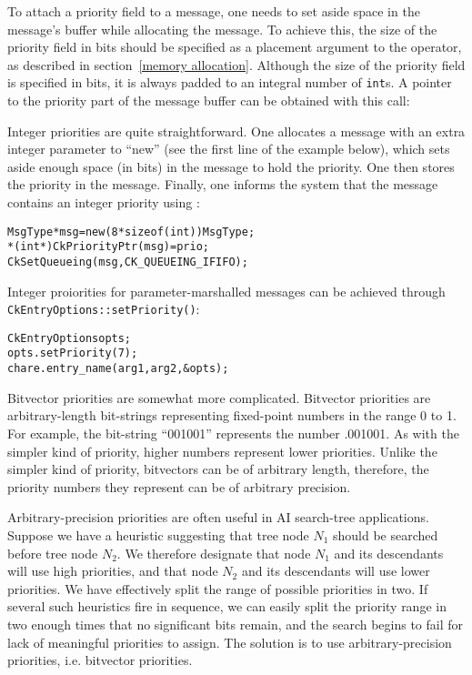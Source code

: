To attach a priority field to a message, one needs to set aside space in the
message's buffer while allocating the message.  To
achieve this, the size of the priority field in bits
should be specified as a placement argument to the  operator, as
described in section~\ref{memory allocation}.  Although the size of the
priority field is specified in bits, it is always padded to an integral number
of {\tt int}s.  A pointer to the priority part of the message buffer can be
obtained with this call:\\


Integer priorities are quite straightforward.  One allocates a message
with an extra integer parameter to ``new'' (see the first line of the
example below), which sets aside enough space (in bits) in the message
to hold the priority.  One then stores the priority in the message.
Finally, one informs the system that the message contains an integer
priority using :

\begin{alltt}
  MsgType *msg = new (8*sizeof(int)) MsgType;
  *(int*)CkPriorityPtr(msg) = prio;
  CkSetQueueing(msg, CK_QUEUEING_IFIFO);
\end{alltt}

Integer proiorities for parameter-marshalled messages can be achieved
through {\tt CkEntryOptions::setPriority()}:

\begin{alltt}
  CkEntryOptions opts;
  opts.setPriority(7);
  chare.entry_name(arg1, arg2, &opts);
\end{alltt}

Bitvector priorities are somewhat more complicated.  Bitvector
priorities are arbitrary-length bit-strings representing fixed-point
numbers in the range 0 to 1.  For example, the bit-string ``001001''
represents the number .001001\raisebox{-.5ex}{\scriptsize binary}.  As
with the simpler kind of priority, higher numbers represent lower
priorities.  Unlike the simpler kind of priority, bitvectors can be of
arbitrary length, therefore, the priority numbers they represent can
be of arbitrary precision.

Arbitrary-precision priorities
are often useful in AI search-tree applications.  Suppose we have a
heuristic suggesting that tree node $N_1$ should be searched before
tree node $N_2$.  We therefore designate that node $N_1$ and its
descendants will use high priorities, and that node $N_2$ and its
descendants will use lower priorities.  We have effectively split the
range of possible priorities in two.  If several such heuristics fire
in sequence, we can easily split the priority range  in two enough times that no significant bits remain,
and the search begins to fail for lack of meaningful priorities to
assign.  The solution is to use arbitrary-precision priorities,
i.e. bitvector priorities.

